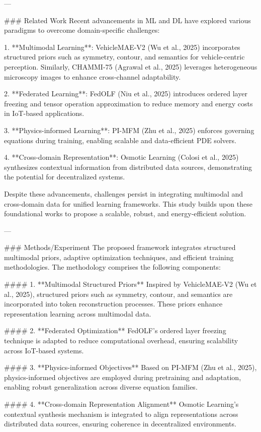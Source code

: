 ---

### Related Work  
Recent advancements in ML and DL have explored various paradigms to overcome domain-specific challenges:

1. **Multimodal Learning**: VehicleMAE-V2 (Wu et al., 2025) incorporates structured priors such as symmetry, contour, and semantics for vehicle-centric perception. Similarly, CHAMMI-75 (Agrawal et al., 2025) leverages heterogeneous microscopy images to enhance cross-channel adaptability.

2. **Federated Learning**: FedOLF (Niu et al., 2025) introduces ordered layer freezing and tensor operation approximation to reduce memory and energy costs in IoT-based applications.

3. **Physics-informed Learning**: PI-MFM (Zhu et al., 2025) enforces governing equations during training, enabling scalable and data-efficient PDE solvers.

4. **Cross-domain Representation**: Osmotic Learning (Colosi et al., 2025) synthesizes contextual information from distributed data sources, demonstrating the potential for decentralized systems.

Despite these advancements, challenges persist in integrating multimodal and cross-domain data for unified learning frameworks. This study builds upon these foundational works to propose a scalable, robust, and energy-efficient solution.

---

### Methods/Experiment  
The proposed framework integrates structured multimodal priors, adaptive optimization techniques, and efficient training methodologies. The methodology comprises the following components:

#### 1. **Multimodal Structured Priors**  
Inspired by VehicleMAE-V2 (Wu et al., 2025), structured priors such as symmetry, contour, and semantics are incorporated into token reconstruction processes. These priors enhance representation learning across multimodal data.

#### 2. **Federated Optimization**  
FedOLF's ordered layer freezing technique is adapted to reduce computational overhead, ensuring scalability across IoT-based systems.

#### 3. **Physics-informed Objectives**  
Based on PI-MFM (Zhu et al., 2025), physics-informed objectives are employed during pretraining and adaptation, enabling robust generalization across diverse equation families.

#### 4. **Cross-domain Representation Alignment**  
Osmotic Learning's contextual synthesis mechanism is integrated to align representations across distributed data sources, ensuring coherence in decentralized environments.


